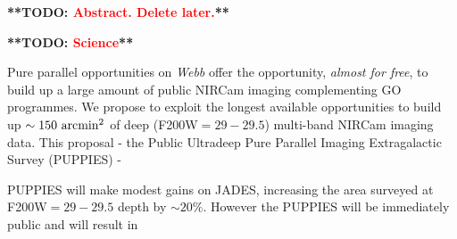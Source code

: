 \documentclass[12pt]{article}
\newcommand{\todo}[1]{\textbf{**TODO: \textcolor{red}{#1}**}}
\begin{document}
%
%






\todo{Abstract. Delete later.}


\todo{Science}

Pure parallel opportunities on \emph{Webb} offer the opportunity, \emph{almost for free}, to build up a large amount of public NIRCam imaging complementing GO programmes. We propose to exploit the longest available opportunities to build up $\sim 150\ {\rm arcmin^2}$ of deep (F200W$=29-29.5$) multi-band NIRCam imaging data. This proposal - the Public Ultradeep Pure Parallel Imaging Extragalactic Survey (PUPPIES) - 

PUPPIES will make modest gains on JADES, increasing the area surveyed at F200W$=29-29.5$ depth by $\sim 20\%$. However the PUPPIES will be immediately public and will result in 




\end{document}
